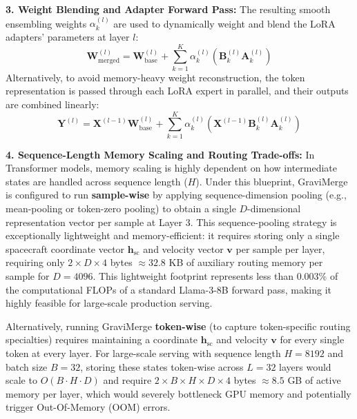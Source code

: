 \textbf{3. Weight Blending and Adapter Forward Pass: } The resulting smooth ensembling weights $\alpha_k^{(l)}$ are used to dynamically weight and blend the LoRA adapters' parameters at layer $l$:
\begin{equation}
    \mathbf{W}_{\text{merged}}^{(l)} = \mathbf{W}_{\text{base}}^{(l)} + \sum_{k=1}^K \alpha_k^{(l)} \left( \mathbf{B}_k^{(l)} \mathbf{A}_k^{(l)} \right)
\end{equation}
Alternatively, to avoid memory-heavy weight reconstruction, the token representation is passed through each LoRA expert in parallel, and their outputs are combined linearly:
\begin{equation}
    \mathbf{Y}^{(l)} = \mathbf{X}^{(l-1)} \mathbf{W}_{\text{base}}^{(l)} + \sum_{k=1}^K \alpha_k^{(l)} \left( \mathbf{X}^{(l-1)} \mathbf{B}_k^{(l)} \mathbf{A}_k^{(l)} \right)
\end{equation}

\textbf{4. Sequence-Length Memory Scaling and Routing Trade-offs: } 
In Transformer models, memory scaling is highly dependent on how intermediate states are handled across sequence length ($H$). Under this blueprint, GraviMerge is configured to run \textbf{sample-wise} by applying sequence-dimension pooling (e.g., mean-pooling or token-zero pooling) to obtain a single $D$-dimensional representation vector per sample at Layer 3. This sequence-pooling strategy is exceptionally lightweight and memory-efficient: it requires storing only a single spacecraft coordinate vector $\mathbf{h}_{\text{sc}}$ and velocity vector $\mathbf{v}$ per sample per layer, requiring only $2 \times D \times 4$ bytes $\approx 32.8$ KB of auxiliary routing memory per sample for $D=4096$. This lightweight footprint represents less than $0.003\%$ of the computational FLOPs of a standard Llama-3-8B forward pass, making it highly feasible for large-scale production serving.

Alternatively, running GraviMerge \textbf{token-wise} (to capture token-specific routing specialties) requires maintaining a coordinate $\mathbf{h}_{\text{sc}}$ and velocity $\mathbf{v}$ for every single token at every layer. For large-scale serving with sequence length $H=8192$ and batch size $B=32$, storing these states token-wise across $L=32$ layers would scale to $O(B \cdot H \cdot D)$ and require $2 \times B \times H \times D \times 4$ bytes $\approx 8.5$ GB of active memory per layer, which would severely bottleneck GPU memory and potentially trigger Out-Of-Memory (OOM) errors. 

